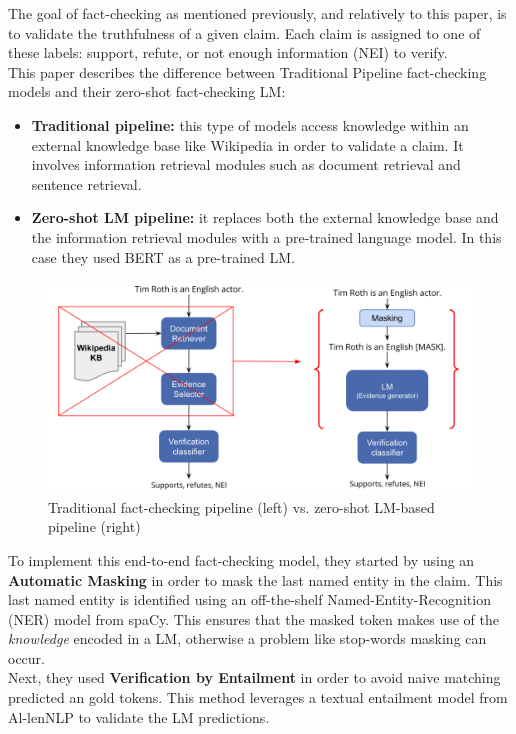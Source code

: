 \documentclass[10pt, english]{report}
\begin{document}
The goal of fact-checking as mentioned previously, and relatively to this paper, is to validate the truthfulness of a given claim. Each claim is assigned to one of these labels: support, refute, or not enough information (NEI) to verify.\\

This paper describes the difference between Traditional Pipeline fact-checking models and their zero-shot fact-checking LM:

\begin{itemize}
\item \textbf{Traditional pipeline:} this type of models access knowledge within an external knowledge base like Wikipedia in order to validate a claim. It involves information retrieval modules such as document retrieval and sentence retrieval.
\item \textbf{Zero-shot LM pipeline:} it replaces both the external knowledge base and the information retrieval modules with a pre-trained language model. In this case they used BERT as a pre-trained LM.
\end{itemize}

\begin{figure}[H]
	\centering
	\includegraphics[scale=0.35]{img/tradition_and_zero_shot_lm.png}
	\caption{Traditional fact-checking pipeline (left) vs. zero-shot LM-based pipeline (right) \cite{lee2020language}}
\end{figure}

To implement this end-to-end fact-checking model, they started by using an \textbf{Automatic Masking} in order to mask the last named entity in the claim. This last named entity is identified using an off-the-shelf Named-Entity-Recognition (NER) model from spaCy. This ensures that the masked token makes use of the \textit{knowledge} encoded in a LM, otherwise a problem like stop-words masking can occur.\\
Next, they used \textbf{Verification by Entailment} in order to avoid naive matching predicted an gold tokens. This method leverages a textual entailment model from Al-lenNLP to validate the LM predictions.\\
\end{document}
